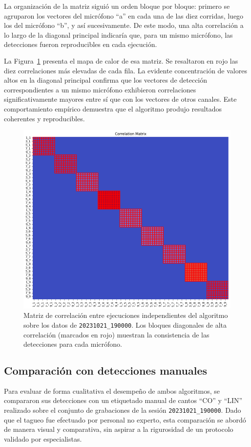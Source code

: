 La organización de la matriz siguió un orden bloque por bloque: 
primero se agruparon los vectores del micrófono “a” en cada una 
de las diez corridas, luego los del micrófono “b”, y así 
sucesivamente. De este modo, una alta correlación a lo largo de 
la diagonal principal indicaría que, para un mismo micrófono, 
las detecciones fueron reproducibles en cada ejecución.

La Figura~\ref{fig:correlation} presenta el mapa de calor de esa 
matriz. Se resaltaron en rojo las diez correlaciones más 
elevadas de cada fila. La evidente concentración de valores 
altos en la diagonal principal confirma que los vectores de 
detección correspondientes a un mismo micrófono exhibieron 
correlaciones significativamente mayores entre sí que con los 
vectores de otros canales. Este comportamiento empírico 
demuestra que el algoritmo produjo resultados coherentes y 
reproducibles.

\begin{figure}[ht]
    \centering
    \includegraphics[width=0.7\linewidth]{Graphics/correlation_matrix.png}
    \caption{Matriz de correlación entre ejecuciones independientes del algoritmo sobre los datos de \texttt{20231021\_190000}. Los bloques diagonales de alta correlación (marcados en rojo) muestran la consistencia de las detecciones para cada micrófono.}
    \label{fig:correlation}
\end{figure}


\subsection{Comparación con detecciones manuales}

Para evaluar de forma cualitativa el desempeño de ambos 
algoritmos, se compararon sus detecciones con un etiquetado 
manual de cantos “CO” y “LIN” realizado sobre el conjunto de 
grabaciones de la sesión \texttt{20231021\_190000}. Dado que el 
tagueo fue efectuado por personal no experto, esta comparación 
se abordó de manera visual y comparativa, sin aspirar a la 
rigurosidad de un protocolo validado por especialistas.  

